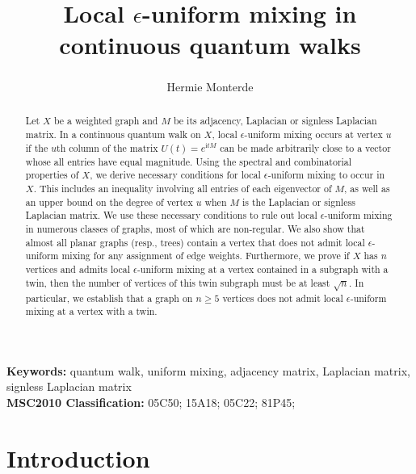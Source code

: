 \documentclass[11pt]{article}
\def\ii{\mathrm{i}}
\begin{document}
\title{Local $\epsilon$-uniform mixing in continuous quantum walks}

\author{
	Hermie Monterde\textsuperscript{\hspace{-0.05cm} }
}
\date{}
\maketitle

\begin{abstract}
Let $X$ be a weighted graph and $M$ be its adjacency, Laplacian or signless Laplacian matrix. In a continuous quantum walk on $X$, local $\epsilon$-uniform mixing occurs at vertex $u$ if the $u$th column of the matrix $U(t)=e^{\ii tM}$ can be made arbitrarily close to a vector whose all entries have equal magnitude. Using the spectral and combinatorial properties of $X$, we derive necessary conditions for local $\epsilon$-uniform mixing to occur in $X$. This includes an inequality involving all entries of each eigenvector of $M$, as well as an upper bound on the degree of vertex $u$ when $M$ is the Laplacian or signless Laplacian matrix. We use these necessary conditions to rule out local $\epsilon$-uniform mixing in numerous classes of graphs, most of which are non-regular. We also show that almost all planar graphs (resp., trees) contain a vertex that does not admit local $\epsilon$-uniform mixing for any assignment of edge weights. Furthermore, we prove if $X$ has $n$ vertices and admits local $\epsilon$-uniform mixing at a vertex contained in a subgraph with a twin, then the number of vertices of this twin subgraph must be at least $\sqrt{n}$. In particular, we establish that a graph on $n\geq 5$ vertices does not admit local $\epsilon$-uniform mixing at a vertex with a twin. 
\end{abstract}

\noindent \textbf{Keywords:} quantum walk, uniform mixing, adjacency matrix, Laplacian matrix, signless Laplacian matrix\\
	
\noindent \textbf{MSC2010 Classification:} 
05C50; %
15A18;  %
05C22; %
81P45; %

\addtocounter{footnote}{1}

\section{Introduction}\label{secINTRO}
\end{document}
